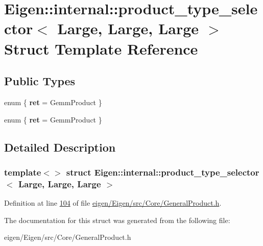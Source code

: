 \hypertarget{struct_eigen_1_1internal_1_1product__type__selector_3_01_large_00_01_large_00_01_large_01_4}{}\section{Eigen\+:\+:internal\+:\+:product\+\_\+type\+\_\+selector$<$ Large, Large, Large $>$ Struct Template Reference}
\label{struct_eigen_1_1internal_1_1product__type__selector_3_01_large_00_01_large_00_01_large_01_4}
\subsection*{Public Types}
\begin{DoxyCompactItemize}
\item 
\mbox{\label{struct_eigen_1_1internal_1_1product__type__selector_3_01_large_00_01_large_00_01_large_01_4_a058c1b0e05f782e6536a60aac7d89bff}} 
enum \{ {\bfseries ret} = Gemm\+Product
 \}
\item 
\mbox{\label{struct_eigen_1_1internal_1_1product__type__selector_3_01_large_00_01_large_00_01_large_01_4_aa0cbb12b7f515cbd6497dfb6e731ae58}} 
enum \{ {\bfseries ret} = Gemm\+Product
 \}
\end{DoxyCompactItemize}


\subsection{Detailed Description}
\subsubsection*{template$<$$>$\newline
struct Eigen\+::internal\+::product\+\_\+type\+\_\+selector$<$ Large, Large, Large $>$}



Definition at line \hyperlink{eigen_2_eigen_2src_2_core_2_general_product_8h_source_l00104}{104} of file \hyperlink{eigen_2_eigen_2src_2_core_2_general_product_8h_source}{eigen/\+Eigen/src/\+Core/\+General\+Product.\+h}.



The documentation for this struct was generated from the following file\+:\begin{DoxyCompactItemize}
\item 
eigen/\+Eigen/src/\+Core/\+General\+Product.\+h\end{DoxyCompactItemize}
